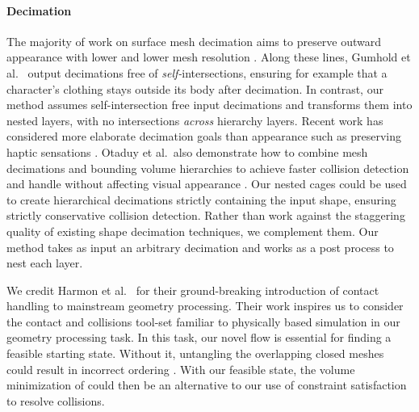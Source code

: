 \paragraph{Decimation}
%
The majority of work on surface mesh decimation aims to preserve outward
appearance with lower and lower mesh resolution
\cite{Hoppe:1996:PM,Garland:1997:SSU,Melax98}.
%
Along these lines, Gumhold et al.\  output decimations free of
\emph{self-}intersections, ensuring for example that a character's clothing
stays outside its body after decimation.
%
In contrast, our method assumes self-intersection free input decimations and
transforms them into nested layers, with no intersections \emph{across}
hierarchy layers.
%
Recent work has considered more elaborate decimation goals than appearance such
as preserving haptic sensations \cite{Otaduy:2003:SPS}.
%
Otaduy et al.\ also demonstrate how to combine mesh decimations and bounding
volume hierarchies to achieve faster collision detection and handle without
affecting visual appearance .
%
Our nested cages could be used to create hierarchical decimations strictly
containing the input shape, ensuring strictly conservative collision detection.
%
Rather than work against the staggering quality of existing shape decimation
techniques, we complement them. Our method takes as input an arbitrary
decimation and works as a post process to nest each layer.




We credit Harmon et al.\  for their
ground-breaking introduction of contact handling to mainstream geometry
processing. Their work inspires us to consider the contact and collisions
tool-set familiar to physically based simulation in our geometry processing
task.
%
In this task, our novel flow is essential for finding a feasible starting
state.
%
Without it, untangling the overlapping closed meshes could result in incorrect
ordering \cite{Baraff:2003:UC}.
%
With our feasible state, the volume minimization of
\cite{ContactAwareModeling:2011} could then be an alternative to our use of
constraint satisfaction to resolve collisions.
